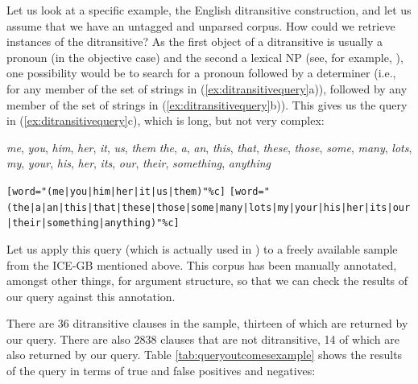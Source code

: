 Let us look at a specific example, the English ditransitive construction, and let us assume that we have an untagged and unparsed corpus. How could we retrieve instances of the ditransitive? As the first object of a ditransitive is usually a pronoun (in the objective case) and the second a lexical NP (see, for example, \citet{thompson_iconicity_1987}), one possibility would be to search for a pronoun followed by a determiner (i.e., for any member of the set of strings in (\ref{ex:ditransitivequery}a)), followed by any member of the set of strings in (\ref{ex:ditransitivequery}b)). This gives us the query in (\ref{ex:ditransitivequery}c), which is long, but not very complex:

\begin{exe}
\ex
\begin{xlist} 
\label{ex:ditransitivequery}
\ex \textit{me}, \textit{you}, \textit{him}, \textit{her}, \textit{it}, \textit{us}, \textit{them}
\ex \textit{the}, \textit{a}, \textit{an}, \textit{this}, \textit{that}, \textit{these}, \textit{those}, \textit{some}, \textit{many}, \textit{lots}, \textit{my}, \textit{your}, \textit{his}, \textit{her}, \textit{its}, \textit{our}, \textit{their}, \textit{something}, \textit{anything}
\ex \begin{minipage}[t]{0.85\textwidth} \raggedright \texttt{[word="(me|\allowbreak you|\allowbreak him|\allowbreak her|\allowbreak it|\allowbreak us|\allowbreak them)"\%c]} \texttt{[word="(the|\allowbreak a|\allowbreak an|\allowbreak this|\allowbreak that|\allowbreak these|\allowbreak those|\allowbreak some|\allowbreak many|\allowbreak lots|\allowbreak my|\allowbreak your|\allowbreak his|\allowbreak her|\allowbreak its|\allowbreak our|\allowbreak their|\allowbreak something|\allowbreak anything)"\%c]} \end{minipage}
\end{xlist}
\end{exe}

Let us apply this query (which is actually used in \citet{colleman_constructional_2011}) to a freely available sample from the ICE-GB mentioned above. This corpus has been manually annotated, amongst other things, for argument structure, so that we can check the results of our query against this annotation.

There are 36 ditransitive clauses in the sample, thirteen of which are returned by our query. There are also 2838 clauses that are not ditransitive, 14 of which are also returned by our query. Table \ref{tab:queryoutcomesexample} shows the results of the query in terms of true and false positives and negatives:

